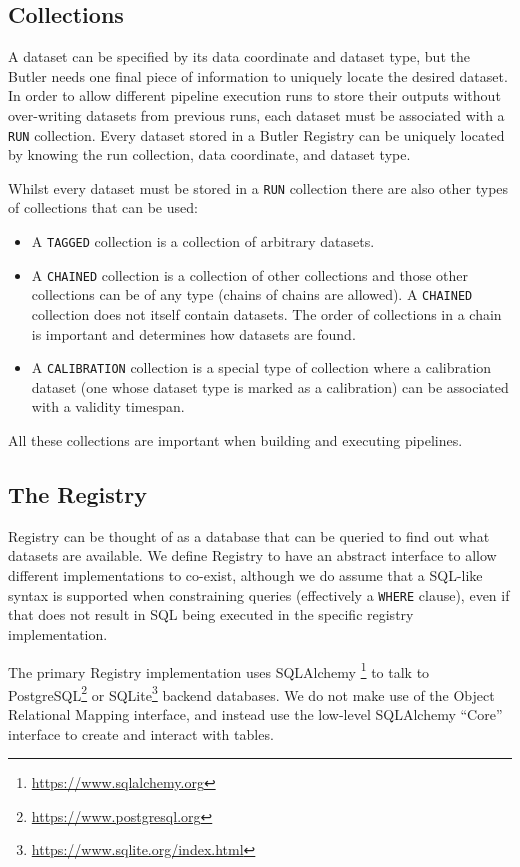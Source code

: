 \documentclass[]{spie}
\begin{document}
\subsection{Collections}

A dataset can be specified by its data coordinate and dataset type, but the Butler needs one final piece of information to uniquely locate the desired dataset.
In order to allow different pipeline execution runs to store their outputs without over-writing datasets from previous runs, each dataset must be associated with a \texttt{RUN} collection.
Every dataset stored in a Butler Registry can be uniquely located by knowing the run collection, data coordinate, and dataset type.

Whilst every dataset must be stored in a \texttt{RUN} collection there are also other types of collections that can be used:

\begin{itemize}
\item A \texttt{TAGGED} collection is a collection of arbitrary datasets.
\item A \texttt{CHAINED} collection is a collection of other collections and those other collections can be of any type (chains of chains are allowed).
      A \texttt{CHAINED} collection does not itself contain datasets.
      The order of collections in a chain is important and determines how datasets are found.
\item A \texttt{CALIBRATION} collection is a special type of collection where a calibration dataset (one whose dataset type is marked as a calibration) can be associated with a validity timespan.
\end{itemize}

All these collections are important when building and executing pipelines.

\subsection{The Registry}

Registry can be thought of as a database that can be queried to find out what datasets are available.
We define Registry to have an abstract interface to allow different implementations to co-exist, although we do assume that a SQL-like syntax is supported when constraining queries (effectively a \texttt{WHERE} clause), even if that does not result in SQL being executed in the specific registry implementation.

The primary Registry implementation uses SQLAlchemy \cite{myers2015essential}\footnote{\url{https://www.sqlalchemy.org}} to talk to PostgreSQL\footnote{\url{https://www.postgresql.org}} or SQLite\footnote{\url{https://www.sqlite.org/index.html}} backend databases.
We do not make use of the Object Relational Mapping interface, and instead use the low-level SQLAlchemy ``Core'' interface to create and interact with tables.
\end{document}
